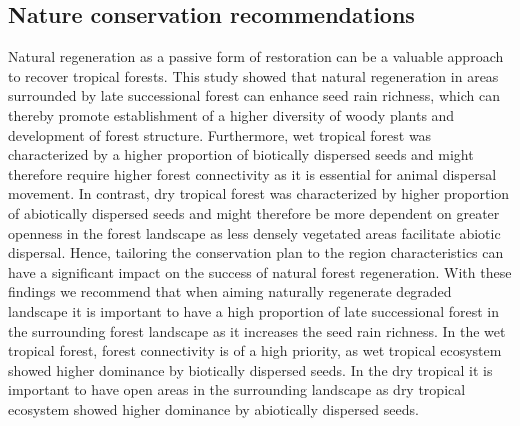 \subsection{Nature conservation recommendations}
Natural regeneration as a passive form of restoration can be a valuable approach to recover tropical forests. This study showed that natural regeneration in areas surrounded by late successional forest can enhance seed rain richness, which can thereby promote establishment of a higher diversity of woody plants and development of forest structure. Furthermore, wet tropical forest was characterized by a higher proportion of biotically dispersed seeds and might therefore require higher forest connectivity as it is essential for animal dispersal movement. In contrast, dry tropical forest was characterized by higher proportion of abiotically dispersed seeds and might therefore be more dependent on greater openness in the forest landscape as less densely vegetated areas facilitate abiotic dispersal. Hence, tailoring the conservation plan to the region characteristics can have a significant impact on the success of natural forest regeneration. With these findings we recommend that when aiming naturally regenerate degraded landscape it is important to have a high proportion of late successional forest in the surrounding forest landscape as it increases the seed rain richness. In the wet tropical forest, forest connectivity is of a high priority, as wet tropical ecosystem showed higher dominance by biotically dispersed seeds. In the dry tropical it is important to have open areas in the surrounding landscape as dry tropical ecosystem showed higher dominance by abiotically dispersed seeds.





 
